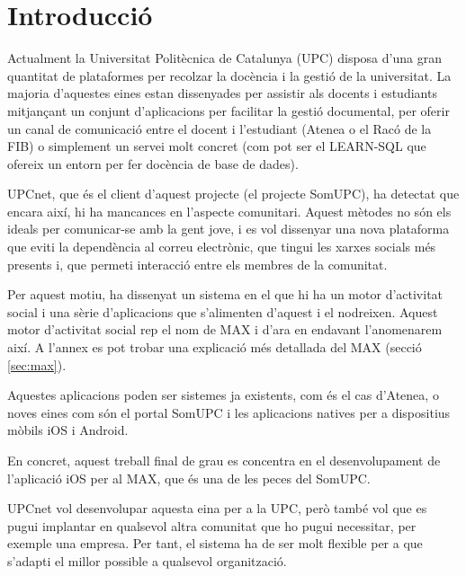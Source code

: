 \section{Introducció}

Actualment la Universitat Politècnica de Catalunya (UPC) disposa d'una gran quantitat de plataformes per recolzar la docència i la gestió de la universitat. La majoria d'aquestes eines estan dissenyades per assistir als docents i estudiants mitjançant un conjunt d'aplicacions per facilitar la gestió documental, per oferir un canal de comunicació entre el docent i l'estudiant (Atenea o el Racó de la FIB) o simplement un servei molt concret (com pot ser el LEARN-SQL que ofereix un entorn per fer docència de base de dades).

UPCnet\cite{upcnet}, que és el client d'aquest projecte (el projecte SomUPC), ha detectat que encara així, hi ha mancances en l'aspecte comunitari. Aquest mètodes no són els ideals per comunicar-se amb la gent jove, i es vol dissenyar una nova plataforma que eviti la dependència al correu electrònic, que tingui les xarxes socials més presents i, que permeti interacció entre els membres de la comunitat.

Per aquest motiu, ha dissenyat un sistema en el que hi ha un motor d'activitat social i una sèrie d'aplicacions que s'alimenten d'aquest i el nodreixen. Aquest motor d'activitat social rep el nom de MAX i d'ara en endavant l'anomenarem així. A l'annex es pot trobar una explicació més detallada del MAX (secció \ref{sec:max}).

Aquestes aplicacions poden ser sistemes ja existents, com és el cas d'Atenea, o noves eines com són el portal SomUPC i les aplicacions natives per a dispositius mòbils iOS i Android.

En concret, aquest treball final de grau es concentra en el desenvolupament de l'aplicació iOS per al MAX, que és una de les peces del SomUPC.

UPCnet vol desenvolupar aquesta eina per a la UPC, però també vol que es pugui implantar en qualsevol altra comunitat que ho pugui necessitar, per exemple una empresa. Per tant, el sistema ha de ser molt flexible per a que s'adapti el millor possible a qualsevol organització.